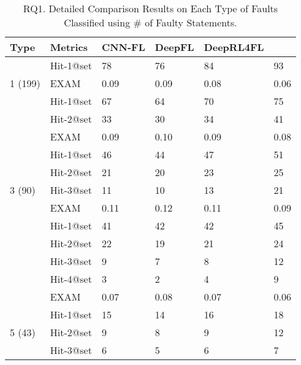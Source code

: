 \begin{table}[t]
	\caption{RQ1. Detailed Comparison Results on Each Type of Faults Classified using \# of Faulty Statements.}
	{\small
		\begin{center}
			\renewcommand{\arraystretch}{1}
			\begin{tabular}{p{0.8cm}<{\centering}|p{1.33cm}<{\centering}|p{1cm}<{\centering}|p{0.7cm}<{\centering}|p{1cm}<{\centering}|p{1cm}<{\centering}}
				\hline
				Type & Metrics & CNN-FL & DeepFL & DeepRL4FL & \tool \\
				\hline
				\multirow{3}{*}{1 (199)}   & Hit-1@set     & 78 & 76 & 84 & 93 \\
							    		 & EXAM          & 0.09 & 0.09 & 0.08 & 0.06 \\
				\hline
				\multirow{4}{*}{2 (142)}  & Hit-1@set     & 67 & 64 & 70 & 75 \\
										& Hit-2@set     & 33 & 30 & 34 & 41 \\
									   	& EXAM          & 0.09 & 0.10 & 0.09 & 0.08 \\
				\hline
				\multirow{5}{*}{3 (90)}  & Hit-1@set     & 46 & 44 & 47 & 51 \\
										& Hit-2@set     & 21 & 20 & 23 & 25\\
										& Hit-3@set     & 11 &10 & 13 & 21 \\
										& EXAM          & 0.11 & 0.12 & 0.11 & 0.09 \\
				\hline
				\multirow{6}{*}{4 (78)}  & Hit-1@set     & 41 & 42 & 42 & 45 \\
										& Hit-2@set     &22 & 19 & 21 & 24 \\
										& Hit-3@set     & 9 & 7 & 8 & 12 \\
										& Hit-4@set     & 3 & 2 & 4 & 9 \\
										& EXAM          & 0.07 & 0.08 & 0.07 & 0.06 \\
				\hline
				\multirow{7}{*}{5 (43)}  & Hit-1@set     & 15 & 14 & 16 & 18 \\
										& Hit-2@set     & 9 & 8 & 9 & 12 \\
										& Hit-3@set     & 6 & 5 & 6 & 7 \\

\end{tabular}
\end{center}}
\end{table}
